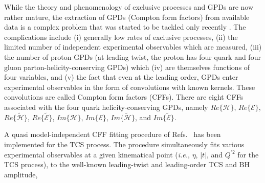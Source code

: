 While the theory and phenomenology of exclusive processes and GPDs are now
rather mature, the extraction of GPDs (Compton form factors) from available
data is a complex problem that was started to be tackled only recently
\cite{Guidal:2008ie,Kumericki:2007sa,Moutarde:2009fg,Guidal:2009aa,
Guidal:2010ig,Guidal:2010de,Moutarde:2010uk,Moutarde:2011zz,Kumericki:2011aa}.
The complications include (i) generally low rates of exclusive processes, (ii)
the limited number of independent experimental observables which are measured,
(iii) the number of proton GPDs (at leading twist, the proton has four quark
and four gluon parton-helicity-conserving GPDs) which (iv) are themselves
functions of four variables, and (v) the fact that even at the leading order,
GPDs enter experimental observables in the form of convolutions with known
kernels. These convolutions are called Compton form factors (CFFs). There are
eight CFFs associated with the four quark helicity-conserving GPDs, namely
$Re\{\mathcal{H}\}$, $Re\{\mathcal{E}\}$, $Re\{\tilde{\mathcal{H}}\}$,
$Re\{\tilde{\mathcal{E}}\}$, $Im\{\mathcal{H}\}$, $Im\{\mathcal{E}\}$,
$Im\{\tilde{\mathcal{H}}\}$, and $Im\{\tilde{\mathcal{E}}\}$.

A quasi model-independent CFF fitting procedure of
Refs.~\cite{Guidal:2008ie,Guidal:2009aa,Guidal:2010ig,Guidal:2010de}
has been implemented for the TCS process. The procedure simultaneously fits
various experimental observables at a given kinematical point (\textit{i.e.},
$\eta$, $|t|$, and $Q^{\prime 2}$ for the TCS process), to the well-known
leading-twist and leading-order TCS and BH amplitude,


